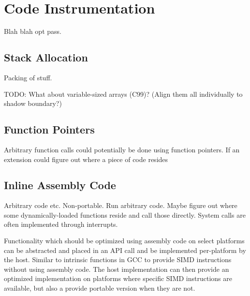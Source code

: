 \chapter {Code Instrumentation}

Blah blah opt pass.

\section {Stack Allocation}

Packing of stuff.

TODO: What about variable-sized arrays (C99)? (Align them all individually to
shadow boundary?)


\section {Function Pointers}

Arbitrary function calls could potentially be done using function pointers. If
an extension could figure out where a piece of code resides


\section {Inline Assembly Code}

Arbitrary code etc. Non-portable. Run arbitrary code. Maybe figure out where
some dynamically-loaded functions reside and call those directly. System calls
are often implemented through interrupts. 

Functionality which should be optimized using assembly code on select platforms
can be abstracted and placed in an API call and be implemented per-platform by
the host. Similar to intrinsic functions in GCC to provide SIMD instructions
without using assembly code. The host implementation can then provide an
optimized implementation on platforms where specific SIMD instructions are
available, but also a provide portable version when they are not.
